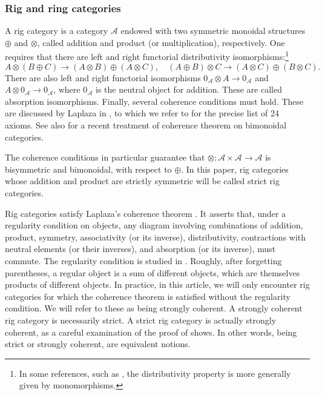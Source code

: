 \documentclass[11pt]{article}
\theoremstyle{plain}
\theoremstyle{definition}
\newcommand{\Acal}{\mathcal A}
\begin{document}
\subsubsection{Rig and ring categories}\label{subsubsec:rig-and-ring-categories}

A rig category is a category $\Acal$ endowed with two symmetric monoidal structures $\oplus$ and $\otimes$, called addition and product (or multiplication), respectively. One requires that there are left and right functorial distributivity isomorphisms:\footnote{In some references, such as \cite{Laplaza}, the distributivity property is more generally given by monomorphisms.}\vspace*{-3pt}\enlargethispage{\baselineskip}
\begin{displaymath}
A\otimes (B\oplus C)\to (A\otimes B)\oplus (A\otimes C),\quad (A\oplus B)\otimes C\to (A\otimes C)\oplus (B\otimes C).
\end{displaymath}
There are also left and right functorial isomorphisms $ 0_{\Acal}\otimes A\to 0_{\Acal}$ and $A\otimes 0_{\Acal}\to 0_{\Acal}$, where $0_{\Acal}$ is the neutral object for addition. These are called absorption isomorphisms. Finally, several coherence conditions must hold. These are discussed by Laplaza in \cite[]{Laplaza}, to which we refer to for the precise list of 24 axioms. See also \cite[Vol.\,I]{Johnson-Yau} for a recent treatment of coherence theorem on bimonoidal categories.

The coherence conditions in particular guarantee that $\otimes\colon\Acal\times\Acal\to\Acal$ is bisymmetric and bimonoidal, with respect to $\oplus$. In this paper, rig categories whose addition and product are strictly symmetric will be called strict rig categories.

Rig categories satisfy Laplaza's coherence theorem \cite[]{Laplaza}. It asserts that, under a regularity condition on objects, any diagram involving combinations of addition, product, symmetry, associativity (or its inverse), distributivity, contractions with neutral elements (or their inverses), and absorption (or its inverse), must commute. The regularity condition is studied in \cite[]{Laplaza}. Roughly, after forgetting parentheses, a regular object is a sum of different objects, which are themselves products of different objects. In practice, in this article, we will only encounter rig categories for which the coherence theorem is satisfied without the regularity condition. We will refer to these as being strongly coherent. A strongly coherent rig category is necessarily strict. A strict rig category is actually strongly coherent, as a careful examination of the proof of \cite[Prop.\,10]{Laplaza} shows. In other words, being strict or strongly coherent, are equivalent notions.
\end{document}
